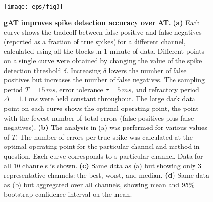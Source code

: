 \documentclass[journal]{IEEEtran}
\begin{document}
\begin{figure}[!t]
\centering
\texttt{[image: eps/fig3]}
\caption{{\bf gAT improves spike detection accuracy over AT.} {\bf (a)} Each curve shows the tradeoff between false positive and false negatives (reported as a fraction of true spikes) for a different channel, calculated using all the blocks in 1 minute of data. Different points on a single curve were obtained by changing the value of the spike detection threshold $\delta$. Increasing $\delta$ lowers the number of false positives but increases the number of false negatives. The sampling period $T = 15\,ms$, error tolerance $\tau = 5\,ms$, and refractory period $\Delta = 1.1\,ms$ were held constant throughout. The large dark data point on each curve shows the optimal operating point, the point with the fewest number of total errors (false positives plus false negatives). {\bf (b)} The analysis in (a) was performed for various values of $T$. The number of errors per true spike was calculated at the optimal operating point for the particular channel and method in question. Each curve corresponds to a particular channel. Data for all 10 channels is shown. {\bf (c)} Same data as (a) but showing only 3 representative channels: the best, worst, and median. {\bf (d)} Same data as (b) but aggregated over all channels, showing mean and 95\% bootstrap confidence interval on the mean.}
\label{fig:ROC}
\end{figure}
\end{document}
